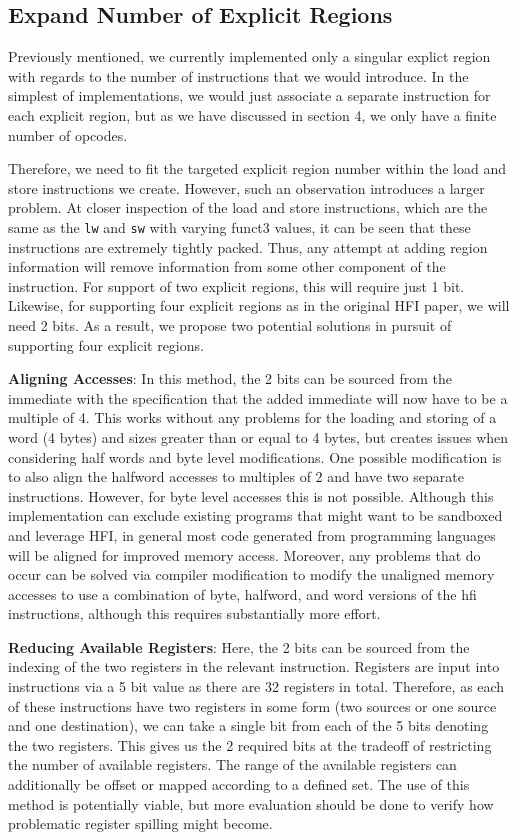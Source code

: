 \documentclass[conference,compsoc]{IEEEtran}
\begin{document}
\subsection{Expand Number of Explicit Regions}
Previously mentioned, we currently implemented only a singular explict region with regards to the number of instructions that we would introduce.
In the simplest of implementations, we would just associate a separate instruction for each explicit region, but as we have discussed in section 4, we only have a finite number of opcodes.

Therefore, we need to fit the targeted explicit region number within the load and store instructions we create.
However, such an observation introduces a larger problem. 
At closer inspection of the load and store instructions, which are the same as the \texttt{lw} and \texttt{sw} with varying funct3 values, it can be seen that these instructions are extremely tightly packed.
Thus, any attempt at adding region information will remove information from some other component of the instruction.
For support of two explicit regions, this will require just 1 bit. Likewise, for supporting four explicit regions as in the original HFI \cite{HFI} paper, we will need 2 bits. 
As a result, we propose two potential solutions in pursuit of supporting four explicit regions.

\textbf{Aligning Accesses}: 
In this method, the 2 bits can be sourced from the immediate with the specification that the added immediate will now have to be a multiple of 4. 
This works without any problems for the loading and storing of a word (4 bytes) and sizes greater than or equal to 4 bytes, but creates issues when considering half words and byte level modifications.
One possible modification is to also align the halfword accesses to multiples of 2 and have two separate instructions. However, for byte level accesses this is not possible.
Although this implementation can exclude existing programs that might want to be sandboxed and leverage HFI, in general most code generated from programming languages will be aligned for improved memory access.
Moreover, any problems that do occur can be solved via compiler modification to modify the unaligned memory accesses to use a combination of byte, halfword, and word versions of the hfi instructions, although this requires substantially more effort.

\textbf{Reducing Available Registers}:
Here, the 2 bits can be sourced from the indexing of the two registers in the relevant instruction. 
Registers are input into instructions via a 5 bit value as there are 32 registers in total.
Therefore, as each of these instructions have two registers in some form (two sources or one source and one destination), 
we can take a single bit from each of the 5 bits denoting the two registers. 
This gives us the 2 required bits at the tradeoff of restricting the number of available registers.
The range of the available registers can additionally be offset or mapped according to a defined set. 
The use of this method is potentially viable, but more evaluation should be done to verify how problematic register spilling might become.
\end{document}
